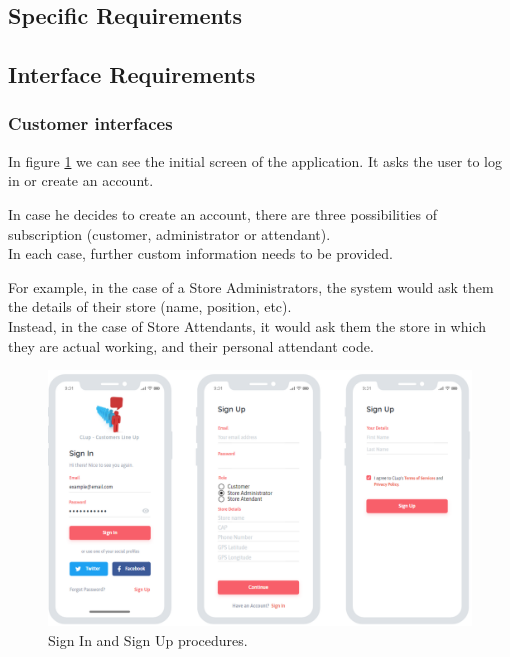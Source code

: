 \documentclass[table, 12pt]{article}
\begin{document}
\begin{flushleft}
    \newpage
    \section{Specific Requirements}
    \subsection{Interface Requirements}
    \subsubsection{Customer interfaces}
    In figure \ref{mock_sign_in_up} we can see the initial screen of the application.
    It asks the user to log in or create an account.

    In case he decides to create an account, there are three possibilities of subscription (customer, administrator or attendant).\\
    In each case, further custom information needs to be provided.

    For example, in the case of a Store Administrators, the system would ask them the details of their store (name, position, etc).\\
    Instead, in the case of Store Attendants, it would ask them the store in which they are actual working, and their personal attendant code.
    \begin{figure}[H]
        \begin{center}
            \includegraphics[width=\textwidth]{assets/mock_sign_in_sign_up.png}
            \caption{Sign In and Sign Up procedures.}
            \label{mock_sign_in_up}
        \end{center}
    \end{figure}


\end{flushleft}
\end{document}
